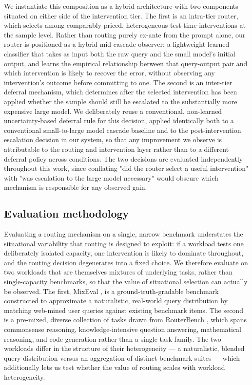 \documentclass[sigconf]{acmart}
\begin{document}
We instantiate this composition as a hybrid architecture with two components situated on either side of the intervention tier. The first is an intra-tier router, which selects among comparably-priced, heterogeneous test-time interventions at the sample level. Rather than routing purely ex-ante from the prompt alone, our router is positioned as a hybrid mid-cascade observer: a lightweight learned classifier that takes as input both the raw query and the small model's initial output, and learns the empirical relationship between that query-output pair and which intervention is likely to recover the error, without observing any intervention's outcome before committing to one. The second is an inter-tier deferral mechanism, which determines after the selected intervention has been applied whether the sample should still be escalated to the substantially more expensive large model. We deliberately reuse a conventional, non-learned uncertainty-based deferral rule for this decision, applied identically both to a conventional small-to-large model cascade baseline and to the post-intervention escalation decision in our system, so that any improvement we observe is attributable to the routing and intervention layer rather than to a different deferral policy across conditions. The two decisions are evaluated independently throughout this work, since conflating "did the router select a useful intervention" with "was escalation to the large model necessary" would obscure which mechanism is responsible for any observed gain.
 
\subsection{Evaluation methodology}
 
Evaluating a routing mechanism on a single, narrow benchmark understates the situational variability that routing is designed to exploit: if a workload tests one deliberately isolated capacity, one intervention is likely to dominate throughout, and the routing decision degenerates into a fixed choice. We therefore evaluate on two workloads that are themselves mixtures of underlying tasks, rather than single-capacity benchmarks, so that the value of situational selection can actually be observed. The first, MixEval \cite{mixeval}, is a ground-truth-gradable benchmark constructed to approximate a naturalistic, real-world query distribution by matching web-mined user queries against existing benchmark items. The second is a pre-mixed, diverse collection of tasks drawn from RouterBench \cite{routerbench}, which spans commonsense reasoning, knowledge-intensive question answering, mathematical reasoning, and code generation rather than a single task family. The two workloads differ in the structure of their heterogeneity — a naturalistic, blended query distribution versus an aggregation of distinct benchmark suites — which additionally lets us test whether the value of routing scales with workload heterogeneity.
 
\end{document}

